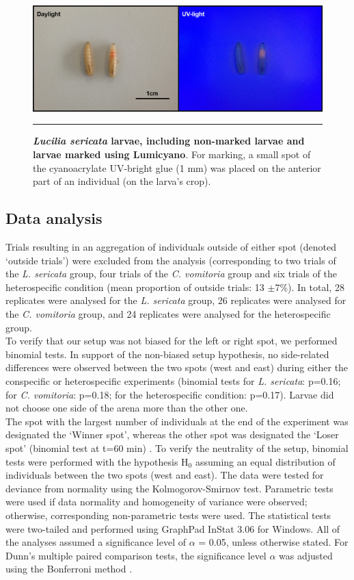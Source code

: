 \begin{figure}[ht]
\centering
		\includegraphics[width=0.8 \textwidth]{Figures/lumicyano.png}
		\rule{35em}{0.5pt}
		\caption[Lumi]{\textbf{\textit{Lucilia sericata} larvae, including non-marked larvae and larvae marked using Lumicyano}. For marking, a small spot of the cyanoacrylate UV-bright glue (1 mm) was placed on the anterior part of an individual (on the larva’s crop).}
	\label{fig:lumi}
\end{figure}


		\subsection{Data analysis}
Trials resulting in an aggregation of individuals outside of either spot (denoted ‘outside trials’) were excluded from the analysis (corresponding to two trials of the \textit{L. sericata} group, four trials of the \textit{C. vomitoria} group and six trials of the heterospecific condition (mean proportion of outside trials: 13 $\pm$7$\%$). In total, 28 replicates were analysed for the \textit{L. sericata} group, 26 replicates were analysed for the \textit{C. vomitoria} group, and 24 replicates were analysed for the heterospecific group.\\
To verify that our setup was not biased for the left or right spot, we performed binomial tests. In support of the non-biased setup hypothesis, no side-related differences were observed between the two spots (west and east) during either the conspecific or heterospecific experiments (binomial tests for \textit{L. sericata}: p=0.16; for \textit{C. vomitoria}: p=0.18; for the heterospecific condition: p=0.17). Larvae did not choose one side of the arena more than the other one.\\
The spot with the largest number of individuals at the end of the experiment was designated the ‘Winner spot’, whereas the other spot was designated the ‘Loser spot’ (binomial test at t=60 min) \citep{halloy_social_2007,sempo_complex_2009}. To verify the neutrality of the setup, binomial tests were performed with the hypothesis H$_{0}$ assuming an equal distribution of individuals between the two spots (west and east). The data were tested for deviance from normality using the Kolmogorov-Smirnov test. Parametric tests were used if data normality and homogeneity of variance were observed; otherwise, corresponding non-parametric tests were used. The statistical tests were two-tailed and performed using GraphPad InStat 3.06 for Windows. All of the analyses assumed a significance level of $\alpha$ = 0.05, unless otherwise stated. For Dunn’s multiple paired comparison tests, the significance level $\alpha$ was adjusted using the Bonferroni method \cite{zar_biostatistical_2010}.


